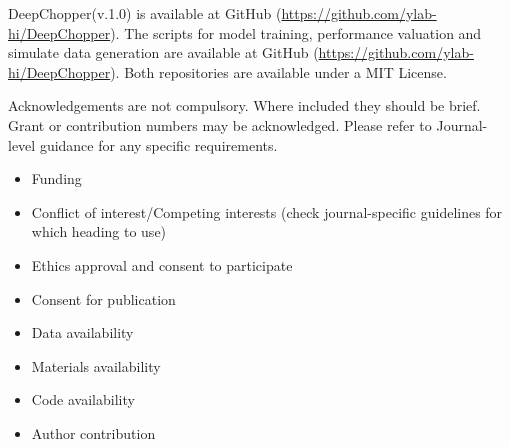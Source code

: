 \documentclass[pdflatex, sn-mathphys-num, lineno]{sn-jnl}%
\newcommand{\chopper}{DeepChopper\xspace}
\theoremstyle{thmstyleone}%
\theoremstyle{thmstyletwo}%
\theoremstyle{thmstylethree}%
\begin{document}

\chopper (v.1.0) is available at GitHub (\url{https://github.com/ylab-hi/DeepChopper}).
The scripts for model training, performance valuation and simulate data generation are available at GitHub (\url{https://github.com/ylab-hi/DeepChopper}).
Both repositories are available under a MIT License.


Acknowledgements are not compulsory. Where included they should be brief. Grant or contribution numbers may be acknowledged.
Please refer to Journal-level guidance for any specific requirements.



\begin{itemize}
	\item Funding
	\item Conflict of interest/Competing interests (check journal-specific guidelines for which heading to use)
	\item Ethics approval and consent to participate
	\item Consent for publication
	\item Data availability
	\item Materials availability
	\item Code availability
	\item Author contribution
\end{itemize}
\end{document}
